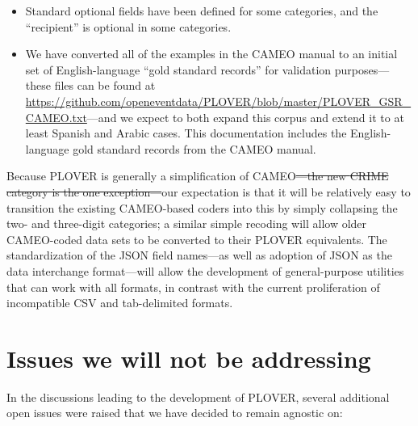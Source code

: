 \documentclass[11pt]{report}
\begin{document}
\begin{itemize}
\item Standard optional fields have been defined for some categories, and the ``recipient'' is optional in some categories.
\item We have converted all of the examples in the CAMEO manual to an initial set of English-language ``gold standard records'' for validation purposes---these files can be found at\\ \url{https://github.com/openeventdata/PLOVER/blob/master/PLOVER_GSR_CAMEO.txt}---and we expect to both expand this corpus and extend it to  at least Spanish and Arabic cases. This documentation includes the English-language gold standard records from the CAMEO manual.
\end{itemize}

Because PLOVER is generally a simplification of CAMEO\sout{---the new \textsf{CRIME} category is the one exception---}our expectation is that it will be relatively easy to transition the existing CAMEO-based coders into this by simply collapsing the two- and three-digit categories; a similar simple recoding will allow older CAMEO-coded data sets to be converted to their PLOVER equivalents. The standardization of the JSON field names---as well as adoption of JSON as the data interchange format---will allow the development of general-purpose utilities that can work with all formats, in contrast with the current proliferation of incompatible CSV and tab-delimited formats.

\section{Issues we will not be addressing}\label{sec:nothing}

In the discussions leading to the development of PLOVER, several additional open issues were raised that we have decided to remain agnostic on:
\end{document}
